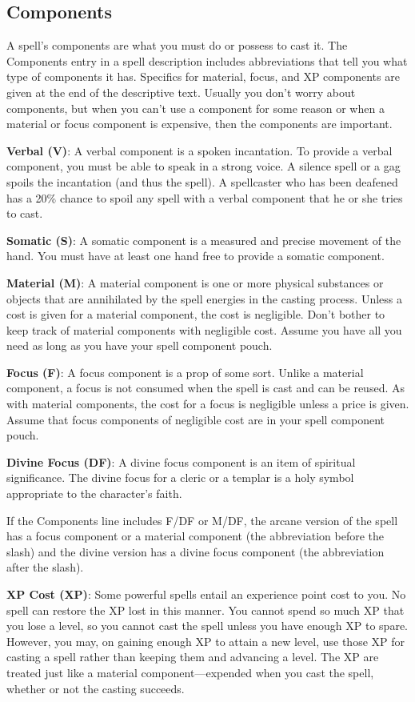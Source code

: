 \subsection{Components}
A spell's components are what you must do or possess to cast it. The Components entry in a spell description includes abbreviations that tell you what type of components it has. Specifics for material, focus, and XP components are given at the end of the descriptive text. Usually you don't worry about components, but when you can't use a component for some reason or when a material or focus component is expensive, then the components are important.

\textbf{Verbal (V)}: A verbal component is a spoken incantation. To provide a verbal component, you must be able to speak in a strong voice. A silence spell or a gag spoils the incantation (and thus the spell). A spellcaster who has been deafened has a 20\% chance to spoil any spell with a verbal component that he or she tries to cast.

\textbf{Somatic (S)}: A somatic component is a measured and precise movement of the hand. You must have at least one hand free to provide a somatic component.

\textbf{Material (M)}: A material component is one or more physical substances or objects that are annihilated by the spell energies in the casting process. Unless a cost is given for a material component, the cost is negligible. Don't bother to keep track of material components with negligible cost. Assume you have all you need as long as you have your spell component pouch.

\textbf{Focus (F)}: A focus component is a prop of some sort. Unlike a material component, a focus is not consumed when the spell is cast and can be reused. As with material components, the cost for a focus is negligible unless a price is given. Assume that focus components of negligible cost are in your spell component pouch.

\textbf{Divine Focus (DF)}: A divine focus component is an item of spiritual significance. The divine focus for a cleric or a templar is a holy symbol appropriate to the character's faith.

If the Components line includes F/DF or M/DF, the arcane version of the spell has a focus component or a material component (the abbreviation before the slash) and the divine version has a divine focus component (the abbreviation after the slash).

\textbf{XP Cost (XP)}: Some powerful spells entail an experience point cost to you. No spell can restore the XP lost in this manner. You cannot spend so much XP that you lose a level, so you cannot cast the spell unless you have enough XP to spare. However, you may, on gaining enough XP to attain a new level, use those XP for casting a spell rather than keeping them and advancing a level. The XP are treated just like a material component---expended when you cast the spell, whether or not the casting succeeds.